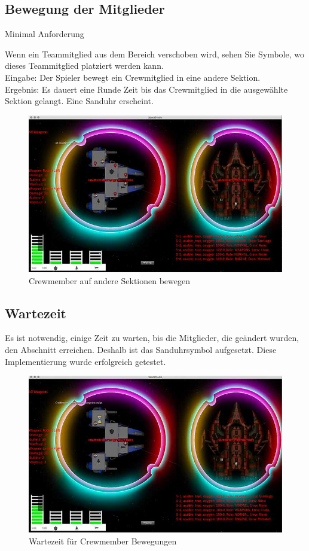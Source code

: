 \documentclass[12pt]{article}
\begin{document}
\subsection{Bewegung der Mitglieder}
Minimal Anforderung

Wenn ein Teammitglied aus dem Bereich verschoben wird, sehen Sie Symbole, wo dieses Teammitglied platziert werden kann.\\
Eingabe: Der Spieler bewegt ein Crewmitglied in eine andere Sektion.\\
Ergebnis: Es dauert eine Runde Zeit bis das Crewmitglied in die ausgewählte Sektion gelangt. Eine Sanduhr erscheint.\\
\begin{figure}[htp]
\centering
\includegraphics[scale=0.6]{TestProtocolBilder/crewmemberpull@0,25x.jpg}
\caption{Crewmember auf andere Sektionen bewegen}
\end{figure}
\newpage
\subsection{Wartezeit}
Es ist notwendig, einige Zeit zu warten, bis die Mitglieder, die geändert wurden, den Abschnitt erreichen. Deshalb ist das Sanduhrsymbol aufgesetzt. Diese Implementierung wurde erfolgreich getestet.
\begin{figure}[htp]
\centering
\includegraphics[scale=0.6]{TestProtocolBilder/timewaiting@0,25x.jpg}
\caption{Wartezeit für Crewmember Bewegungen}
\end{figure}
\newpage
\end{document}
